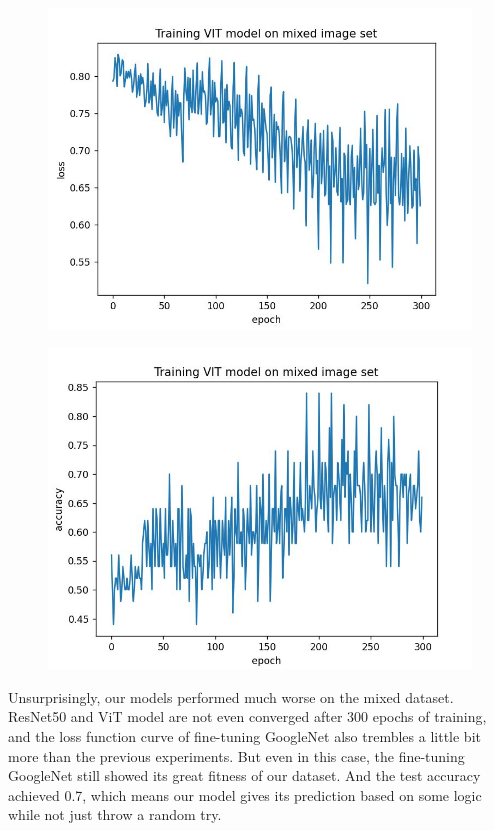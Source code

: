 \documentclass[conference]{IEEEtran}
\begin{document}
\begin{figure}[h]
  \centering
    \begin{minipage}{.24\textwidth}
      \centering
      \includegraphics[width=0.9\linewidth]{ViT_mixed_loss.jpg}
      \label{fig:test1}
    \end{minipage}%
    \begin{minipage}{.24\textwidth}
      \centering
      \includegraphics[width=0.9\linewidth]{ViT_mixed_accuracy.jpg}
      \label{fig:test2}
    \end{minipage}
\end{figure}

Unsurprisingly, our models performed much worse on the mixed dataset. ResNet50 and ViT model are not even converged after 300 epochs of training, and the loss function curve of fine-tuning GoogleNet also trembles a little bit more than the previous experiments. But even in this case, the fine-tuning GoogleNet still showed its great fitness of our dataset.
And the test accuracy achieved 0.7, which means our model gives its prediction based on some logic while not just throw a random try.
\end{document}
